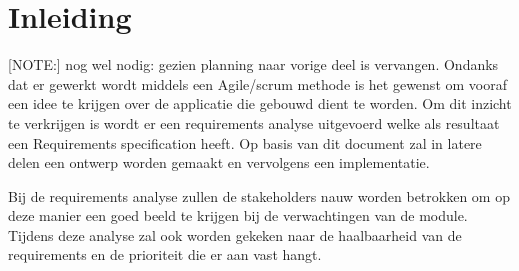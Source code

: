 
\chapter{Inleiding}\label{ch:ReqInl}
[NOTE:] nog wel nodig: gezien planning naar vorige deel is vervangen.
Ondanks dat er gewerkt wordt middels een Agile/scrum methode is het gewenst om vooraf een idee te krijgen over de applicatie die gebouwd dient te worden. Om dit inzicht te verkrijgen is wordt er een requirements analyse uitgevoerd welke als resultaat een Requirements specification heeft. Op basis van dit document zal in latere delen een ontwerp worden gemaakt en vervolgens een implementatie.

Bij de requirements analyse zullen de stakeholders nauw worden betrokken om op deze manier
een goed beeld te krijgen bij de verwachtingen van de module. Tijdens deze analyse zal ook worden gekeken naar de haalbaarheid van de requirements en de prioriteit die er aan vast hangt.
